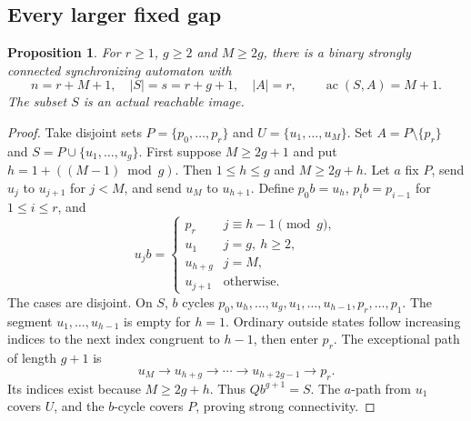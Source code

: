 \documentclass[11pt]{article}
\theoremstyle{definition}
\theoremstyle{plain}
\newtheorem{proposition}[theorem]{Proposition}
\newcommand{\ac}{\operatorname{ac}}
\begin{document}
\subsection{Every larger fixed gap}
\begin{proposition}\label{prop:gaps}
For $r\ge1$, $g\ge2$ and $M\ge2g$, there is a binary strongly connected synchronizing automaton with
\[
 n=r+M+1,\quad |S|=s=r+g+1,\quad |A|=r,
 \qquad \ac(S,A)=M+1.
\]
The subset $S$ is an actual reachable image.
\end{proposition}
\begin{proof}
Take disjoint sets $P=\{p_0,\ldots,p_r\}$ and $U=\{u_1,\ldots,u_M\}$.
Set $A=P\setminus\{p_r\}$ and $S=P\cup\{u_1,\ldots,u_g\}$.
First suppose $M\ge2g+1$ and put $h=1+((M-1)\bmod g)$.
Then $1\le h\le g$ and $M\ge2g+h$.
Let $a$ fix $P$, send $u_j$ to $u_{j+1}$ for $j<M$, and send $u_M$ to $u_{h+1}$.
Define $p_0b=u_h$, $p_ib=p_{i-1}$ for $1\le i\le r$, and
\[
 u_jb=\begin{cases}
 p_r&j\equiv h-1\pmod g,\\
 u_1&j=g,\ h\ge2,\\
 u_{h+g}&j=M,\\
 u_{j+1}&\text{otherwise}.
 \end{cases}
\]
The cases are disjoint. On $S$, $b$ cycles
$p_0,u_h,\ldots,u_g,u_1,\ldots,u_{h-1},p_r,\ldots,p_1$.
The segment $u_1,\ldots,u_{h-1}$ is empty for $h=1$.
Ordinary outside states follow increasing indices to the next index
congruent to $h-1$, then enter $p_r$.
The exceptional path of length $g+1$ is
\[
u_M\longrightarrow u_{h+g}\longrightarrow\cdots
\longrightarrow u_{h+2g-1}\longrightarrow p_r.
\]
Its indices exist because $M\ge2g+h$.
Thus $Qb^{g+1}=S$. The $a$-path from $u_1$ covers $U$, and the $b$-cycle covers $P$,
proving strong connectivity.


\end{proof}
\end{document}
